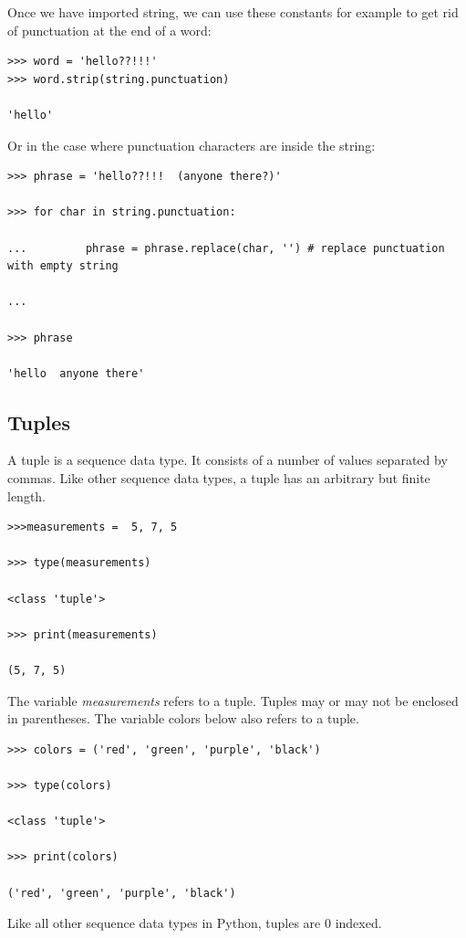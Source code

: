 \documentclass{article}
\begin{document}
Once we have imported string, we can use these constants for example to get rid of punctuation at the end of a word:

\begin{lstlisting}
>>> word = 'hello??!!!'
>>> word.strip(string.punctuation)

'hello'
\end{lstlisting}

Or in the case where punctuation characters are inside the string:

\begin{lstlisting}
>>> phrase = 'hello??!!!  (anyone there?)'

>>> for char in string.punctuation:

...         phrase = phrase.replace(char, '') # replace punctuation with empty string

...

>>> phrase

'hello  anyone there'
\end{lstlisting}

\subsection{Tuples}

A tuple is a sequence data type.  It consists of a number of values separated by commas. Like other sequence data types, a tuple has an arbitrary but finite length.

\begin{lstlisting}
>>>measurements =  5, 7, 5

>>> type(measurements)

<class 'tuple'>

>>> print(measurements)

(5, 7, 5)
\end{lstlisting}

The variable \textit{measurements} refers to a tuple.  Tuples may or may not be enclosed in parentheses.  The variable colors below also refers to a tuple.

\begin{lstlisting}
>>> colors = ('red', 'green', 'purple', 'black')

>>> type(colors)

<class 'tuple'>

>>> print(colors)

('red', 'green', 'purple', 'black')
\end{lstlisting}

Like all other sequence data types in Python, tuples are 0 indexed.
\end{document}
